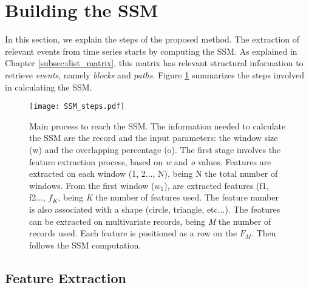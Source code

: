 

\section{Building the SSM}

In this section, we explain the steps of the proposed method. The extraction of relevant events from time series starts by computing the \gls{SSM}. As explained in Chapter \ref{subsec:dist_matrix}, this matrix has relevant structural information to retrieve \textit{events}, namely \textit{blocks} and \textit{paths}. Figure \ref{fig:SSM_scheme} summarizes the steps involved in calculating the \gls{SSM}.

\begin{figure}
\centering
    \texttt{[image: SSM\_steps.pdf]}
    \caption{Main process to reach the \gls{SSM}. The information needed to calculate the \gls{SSM} are the record and the input parameters: the window size (w) and the overlapping percentage (o). The first stage involves the feature extraction process, based on \textit{w} and \textit{o} values. Features are extracted on each window (1, 2..., N), being N the total number of windows. From the first window ($w_1$), are extracted features (f1, f2..., $f_K$, being \textit{K} the number of features used. The feature number is also associated with a shape (circle, triangle, etc...). The features can be extracted on multivariate records, being \textit{M} the number of records used. Each feature is positioned as a row on the $F_M$. Then follows the \gls{SSM} computation.}
    \label{fig:SSM_scheme}
\end{figure}

\subsection{Feature Extraction}

